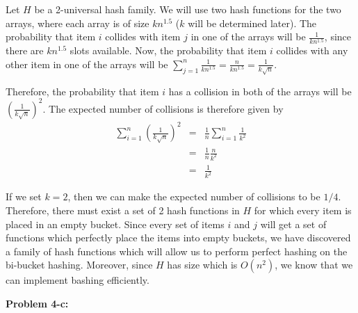 \documentclass[psamsfonts]{amsart}
\newenvironment{sol}{\vspace{0.25cm}{\large \bfseries Solution:}}{\qedsymbol}
\newenvironment{prob}[1]{\begin{framed}{\large \bfseries Problem #1:}}{\end{framed}}
\begin{document}
\begin{sol}
Let $H$ be a 2-universal hash family. We will use two hash functions for the two arrays, where each array is of size $kn^{1.5}$ ($k$ will be determined later). The probability that item $i$ collides with item $j$ in one of the arrays will be $\frac{1}{kn^{1.5}}$, since there are $kn^{1.5}$ slots available. Now, the probability that item $i$ collides with any other item in one of the arrays will be $\sum_{j=1}^n \frac{1}{kn^{1.5}} = \frac{n}{kn^{1.5}} = \frac{1}{k \sqrt{n}}$. 

Therefore, the probability that item $i$ has a collision in both of the arrays will be $\left( \frac{1}{k \sqrt{n}} \right)^2$. The expected number of collisions is therefore given by
\begin{eqnarray}
\sum_{i=1}^n \left( \frac{1}{k\sqrt{n}} \right)^2 &=& \frac{1}{n} \sum_{i=1}^n \frac{1}{k^2} \\
&=& \frac{1}{n} \frac{n}{k^2} \\
&=& \frac{1}{k^2}
\end{eqnarray}

If we set $k=2$, then we can make the expected number of collisions to be $1/4$. Therefore, there must exist a set of 2 hash functions in $H$ for which every item is placed in an empty bucket. Since every set of items $i$ and $j$ will get a set of functions which perfectly place the items into empty buckets, we have discovered a family of hash functions which will allow us to perform perfect hashing on the bi-bucket hashing. Moreover, since $H$ has size which is $O(n^2)$, we know that we can implement bashing efficiently.
\end{sol}

\begin{prob}{4-c}

\end{prob}
\end{document}

